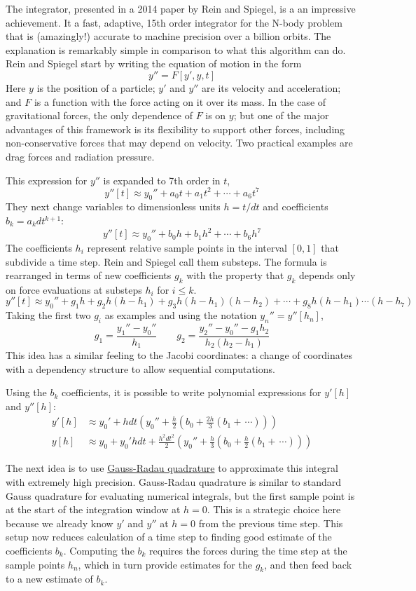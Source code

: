 The  integrator, presented in a 2014 paper by Rein and Spiegel, is a an impressive achievement.
It a fast, adaptive, 15th order integrator for the N-body problem that is (amazingly!) 
accurate to machine precision over a billion orbits.  
The explanation is remarkably simple in comparison to what this algorithm can do.  
Rein and Spiegel start by writing the equation of motion in the form 
$$y'' = F[y', y, t]$$
Here $y$ is the position of a particle; $y'$ and $y''$ are its velocity and acceleration;
and $F$ is a function with the force acting on it over its mass.
In the case of gravitational forces, the only dependence of $F$ is on $y$; 
but one of the major advantages of this framework is its flexibility to support other forces,
including non-conservative forces that may depend on velocity.
Two practical examples are drag forces and radiation pressure.

This expression for $y''$ is expanded to 7th order in $t$, 
$$y''[t] \approx y_0'' + a_0t + a_1t^2 + \cdots +a_6 t^7$$
They next change variables to dimensionless units $h = t / dt$ and coefficients $b_k = a_k dt^{k+1}$:
$$y''[t] \approx y_0'' + b_0h + b_1h^2 + \cdots + b_6 h^7$$
The coefficients $h_i$ represent relative sample points in the interval $[0, 1]$ that subdivide a time step.
Rein and Spiegel call them substeps.  
The formula is rearranged in terms of new coefficients $g_k$ with the property that $g_k$ depends
only on force evaluations at substeps $h_i$ for $i \le k$.
$$y''[t] \approx y_0'' + g_1h + g_2h(h-h_1) + g_3h(h-h_1)(h-h_2) + \cdots + g_8 h (h-h_1) \cdots (h-h_7)$$
Taking the first two $g_i$ as examples and using the notation $y_n'' = y''[h_n]$,
$$g_1 = \frac{y_1'' - y_0''}{h_1} \quad\quad  g_2 = \frac{y_2'' - y_0'' -g_1h_2}{h_2(h_2-h_1)}$$
This idea has a similar feeling to the Jacobi coordinates: a change of coordinates
with a dependency structure to allow sequential computations.

Using the $b_k$ coefficients, it is possible to write polynomial expressions for $y'[h]$ and $y''[h]$:
\begin{align*}
y'[h] &\approx y_0' + h dt \left(y_0'' + \frac{h}{2}\left(b_0 + \frac{2h}{3}\left(b_1 + \frac{}{} \cdots \right)\right) \right) \\
y[h] &\approx y_0 + y_0' h dt + \frac{h^2dt^2}{2}\left(y_0'' + \frac{h}{3}\left(b_0 + \frac{h}{2}\left(b_1 + \frac{}{} \cdots \right)\right) \right)
\end{align*}

The next idea is to use \href{http://mathworld.wolfram.com/RadauQuadrature.html}{Gauss-Radau quadrature}
to approximate this integral with extremely high precision.  
Gauss-Radau quadrature is similar to standard Gauss quadrature for evaluating numerical integrals, 
but the first sample point is at the start of the integration window at $h=0$.
This is a strategic choice here because we already know $y'$ and $y''$ at $h=0$ from the previous time step.
This setup now reduces calculation of a time step to finding good estimate of the coefficients $b_k$.
Computing the $b_k$ requires the forces during the time step at the sample points $h_n$,
which in turn provide estimates for the $g_k$, and then feed back to a new estimate of $b_k$.

